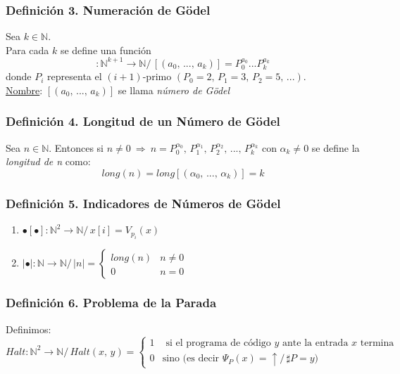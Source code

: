 \documentclass{article}
\newcommand{\comma}{,\,}                                %
\newcommand{\tq}{/\,}                                   %
\newcommand{\naturales}{\mathbb{N}}                     %
\newcommand{\Rightarrows}{\: \Rightarrow \:}            %
\begin{document}
\subsubsection*{Definición 3. Numeración de Gödel}
Sea $k \in \naturales$. \\
Para cada $k$ se define una función
\begin{equation*}
    [ \comma ... \comma ]: \naturales^{k+1} \rightarrow \naturales \tq [(a_0 \comma ... \comma a_k)] = P_0^{a_0} ... P_k^{a_k}
\end{equation*}
donde $P_i$ representa el $(i+1)$-primo $(P_0 = 2 \comma P_1 = 3 \comma P_2 = 5 \comma ...)$.
\\\underline{Nombre}: $[(a_0 \comma ... \comma a_k)]$ se llama \emph{número de Gödel}

\subsubsection*{Definición 4. Longitud de un Número de Gödel}
Sea $n \in \naturales$. Entonces si $n \neq 0 \Rightarrows n = P_0^{\alpha_0} \comma P_1^{\alpha_1} \comma P_2^{\alpha_2} \comma ... \comma P_k^{\alpha_k}$ con $\alpha_k \neq 0$ se define la \emph{longitud de n} como:
\begin{equation*}
    long(n) = long[(\alpha_0 \comma ... \comma \alpha_k)] = k
\end{equation*}

\subsubsection*{Definición 5. Indicadores de Números de Gödel}
\begin{enumerate}
    \item $\bullet [ \bullet ]: \naturales^2 \rightarrow \naturales \tq x[i] = V_{p_i}(x)$
    \item $| \bullet | : \naturales \rightarrow \naturales \tq | n | = \begin{cases}
    long(n) &n \neq 0 \\
    0 &n = 0 
    \end{cases}$
\end{enumerate}

\subsubsection*{Definición 6. Problema de la Parada}
Definimos:
\begin{equation*}
    Halt: \naturales^2 \rightarrow \naturales \tq Halt(x \comma y) = \begin{cases}
    1 &\text{ si el programa de código $y$ ante la entrada $x$ termina} \\
    0 &\text{sino (es decir $\Psi_P (x) = \uparrow \tq \sharp P = y$)}
    \end{cases}
\end{equation*}
\end{document}
